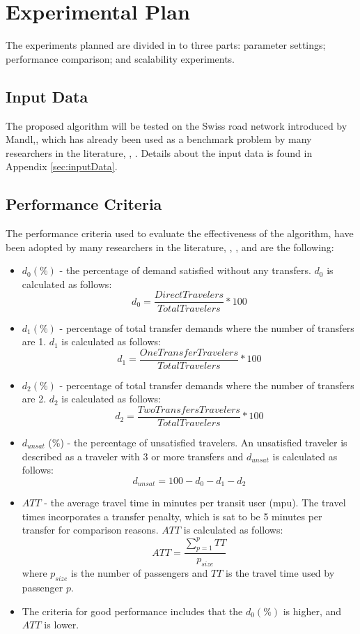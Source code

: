 \section{Experimental Plan}
\label{sec:expPlan}

The experiments planned are divided in to three parts: parameter settings; performance comparison; and scalability experiments.

\subsection{Input Data}
The proposed algorithm will be tested on the Swiss road network introduced by Mandl,\citep{mandl79}, which has already been used as a benchmark problem by many researchers in the literature\citep{kechagiopoulos14}, \citep{mandl79}, \citep{fan09}. Details about the input data is found in Appendix \vref{sec:inputData}.  
\subsection{Performance Criteria}
\label{sec:performanceCriteria}
The performance criteria used to evaluate the effectiveness of the algorithm, have been adopted by many researchers in the literature\citep{kechagiopoulos14}, \citep{mandl79}, \citep{fan09}, and are the following:
\begin{itemize}
\item $d_0 (\%)$ - the percentage of demand satisfied without any transfers. $d_0$ is calculated as follows:
$$ d_0 = \frac{DirectTravelers}{TotalTravelers}*100$$
\item $d_1 (\%)$ - percentage of total transfer demands where the number of transfers are 1. $d_1$ is calculated as follows:
$$ d_1 = \frac{OneTransferTravelers}{TotalTravelers}*100$$
\item $d_2 (\%)$ - percentage of total transfer demands where the number of transfers are 2. $d_2$ is calculated as follows:
$$ d_2 = \frac{TwoTransfersTravelers}{TotalTravelers}*100$$
\item $d_{unsat}$ (\%) - the percentage of unsatisfied travelers. An unsatisfied traveler is described as a traveler with 3 or more transfers and $d_{unsat}$ is calculated as follows:
$$ d_{unsat} = 100 - d_0 - d_1 - d_2$$
\item $ATT$  - the average travel time in minutes per transit user (mpu). The travel times incorporates a transfer penalty, which is sat to be 5 minutes per transfer for comparison reasons. $ATT$ is calculated as follows:
$$ATT = \frac{\sum\limits^{p}_{p=1}TT}{p_{size}}$$
where $p_{size}$ is the number of passengers and $TT$ is the travel time used by passenger $p$. 
\item[ ] The criteria for good performance includes that the $d_0 (\%)$ is higher, and $ATT$ is lower. 
\end{itemize}


